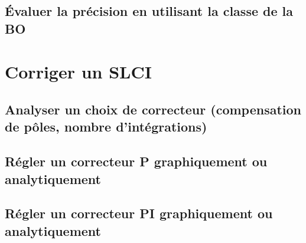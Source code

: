 \section{Évaluer la précision en utilisant la classe de la BO} 
\graphicspath{{\repStyle/png/}{../PERF/PERF-06-Precision/63_BancHydraulique/images/}} 
 
 
\graphicspath{{\repStyle/png/}{../PERF/PERF-06-Precision/64_EPAS/images/}} 
 
 
\graphicspath{{\repStyle/png/}{../PERF/PERF-06-Precision/73_Bassin/images/}} 
 
 
\setchapterpreamble[u]{\margintoc} 
\chapter{Corriger un SLCI} 
\section{Analyser un choix de correcteur (compensation de pôles, nombre d'intégrations)} 
\section{Régler un correcteur P graphiquement ou analytiquement} 
\graphicspath{{\repStyle/png/}{../COR/COR-02-P/65_Eclipse/images/}} 
 
 
\section{Régler un correcteur PI graphiquement ou analytiquement} 
\graphicspath{{\repStyle/png/}{../COR/COR-03-PI/65_Eclipse_02/images/}} 
 
 
\graphicspath{{\repStyle/png/}{../COR/COR-03-PI/66_Micromanipulateur/images/}} 
 
 
\graphicspath{{\repStyle/png/}{../COR/COR-03-PI/67_PompeTurbo/images/}} 
 
 
\graphicspath{{\repStyle/png/}{../COR/COR-03-PI/68_Roburoc/images/}} 
 
 
\graphicspath{{\repStyle/png/}{../COR/COR-03-PI/70_Hublex/images/}} 
 
 

